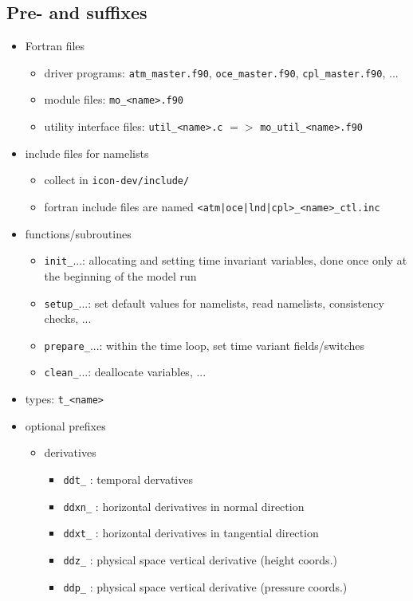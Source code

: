 \documentclass[a4paper,11pt,DIV16,BCOR1cm,titlepage]{scrartcl}
\begin{document}
\subsection{Pre- and suffixes}
%
\begin{itemize}
%
\item Fortran files
\begin{itemize}
\item driver programs: \texttt{atm\_master.f90}, \texttt{oce\_master.f90}, \texttt{cpl\_master.f90}, ...
\item module files: \texttt{mo\_<name>.f90}
\item utility interface files: \texttt{util\_<name>.c} $=>$ \texttt{mo\_util\_<name>.f90}
\end{itemize}
%
\item include files for namelists
\begin{itemize}
\item collect in \texttt{icon-dev/include/}
\item fortran include files are named \texttt{<atm|oce|lnd|cpl>\_<name>\_ctl.inc}
\end{itemize}
%
\item functions/subroutines
\begin{itemize}
\item \texttt{init\_}...: allocating and setting time invariant variables, done once only 
at the beginning of the model run
\item \texttt{setup\_}...: set default values for namelists, read namelists, consistency checks, ...
\item \texttt{prepare\_}...: within the time loop, set time variant fields/switches
\item \texttt{clean\_}...: deallocate variables, ...
\end{itemize}
%
\item types: \texttt{t\_<name>}
%
%
\item optional prefixes
\begin{itemize}
\item derivatives
\begin{itemize}
\item \texttt{ddt\_} : temporal dervatives
\item \texttt{ddxn\_} : horizontal derivatives in normal direction
\item \texttt{ddxt\_} : horizontal derivatives in tangential direction
\item \texttt{ddz\_} : physical space vertical derivative (height coords.)
\item \texttt{ddp\_} : physical space vertical derivative (pressure coords.)
\end{itemize}


\end{itemize}
\end{itemize}
\end{document}
